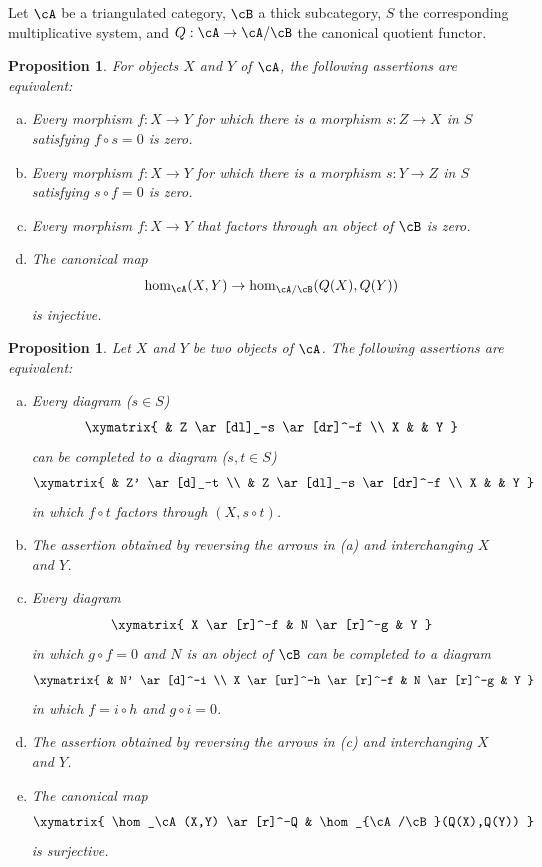 \documentclass[12pt,oneside,english]{smfbook}
\newtheorem{proposition}[subsubsection]{Proposition}
\begin{document}
Let $\cA$ be a triangulated category, $\cB$ a thick subcategory, $S$ the corresponding multiplicative system, and $Q:\cA\to\cA/\cB$ the canonical quotient functor.

\begin{proposition}\label{VIII:2-5-1}
For objects $X$ and $Y$ of $\cA$, the following assertions are equivalent:
\begin{enumerate}[(a)]
  \item Every morphism $f:X\to Y$ for which there is a morphism $s:Z\to X$ in $S$ satisfying $f\circ s=0$ is zero.
  \item Every morphism $f:X\to Y$ for which there is a morphism $s:Y\to Z$ in $S$ satisfying $s\circ f=0$ is zero.
  \item Every morphism $f:X\to Y$ that factors through an object of $\cB$ is zero.
  \item The canonical map
    \[
      \hom_\cA(X,Y) \to \hom_{\cA/\cB}(Q(X),Q(Y))
    \]
    is injective.
\end{enumerate}
\end{proposition}

\begin{proposition}\label{VIII:2-5-2}
Let $X$ and $Y$ be two objects of $\cA$. The following assertions are equivalent:
\begin{enumerate}[(a)]
  \item Every diagram ($s\in S$)
    \[\xymatrix{
      & Z \ar[dl]_-s \ar[dr]^-f \\
      X
        & & Y
    }\]
    can be completed to a diagram ($s,t\in S$)
    \[\xymatrix{
      & Z' \ar[d]_-t \\
      & Z \ar[dl]_-s \ar[dr]^-f \\
      X
        & & Y
    }\]
    in which $f\circ t$ factors through $(X,s\circ t)$.
  \item The assertion obtained by reversing the arrows in (a) and interchanging $X$ and $Y$.
  \item Every diagram
    \[\xymatrix{
      X \ar[r]^-f
        & N \ar[r]^-g
        & Y
    }\]
    in which $g\circ f=0$ and $N$ is an object of $\cB$ can be completed to a diagram
    \[\xymatrix{
      & N' \ar[d]^-i \\
      X \ar[ur]^-h \ar[r]^-f
        & N \ar[r]^-g
        & Y
    }\]
    in which $f=i\circ h$ and $g\circ i=0$.
  \item The assertion obtained by reversing the arrows in (c) and interchanging $X$ and $Y$.
  \item The canonical map
    \[\xymatrix{
      \hom_\cA(X,Y) \ar[r]^-Q
        & \hom_{\cA/\cB}(Q(X),Q(Y))
    }\]
    is surjective.
\end{enumerate}
\end{proposition}
\end{document}
